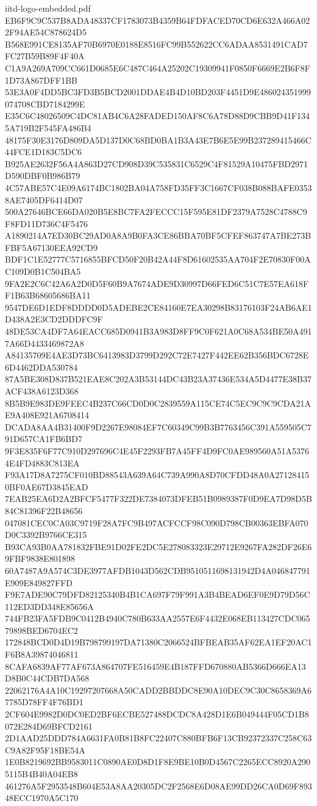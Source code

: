 \begin{filecontents*}[overwrite]{iitd-logo-embedded.pdf}
EB6F9C9C537B8ADA48337CF1783073B4359B64FDFACED70CD6E632A466A022F94AE54C878624D5
B568E991CE8135AF70B6970E0188E8516FC99B552622CC6ADAA8531491CAD7FC27B59B89F4F40A
C1A9A269A709CC661D0685E6C487C464A25202C19309941F0850F6669E2B6F8F1D73A867DFF1BB
53E3A0F4DD5BC3FD3B5BCD2001DDAE4B4D10BD203F4451D9E486024351999074708CBD7184299E
E35C6C48026509C4DC81AB4C6A28FADED150AF8C6A78D88D9CBB9D41F1345A719B2F545FA486B4
48175F30E3176D809DA5D137D0C68BD0BA1B3A43E7B6E5E99B237289415466C44FCE1D183C5DC6
B925AE2632F56A4A863D27CD908D39C535831C6529C4F81529A10475FBD2971D590DBF0B986B79
4C57ABE57C4E09A6174BC1802BA04A758FD35FF3C1667CF038B088BAFE03538AE7405DF6414D07
500A27646BCE66DA020B5E8BC7FA2FECCC15F595E81DF2379A7528C4788C9F8FD11D736C4F5476
A1890214A7ED30BC29AD0A8A9B0FA3CE86BBA70BF5CFEF863747A7BE273BFBF5A67130EEA92CD9
BDF1C1E52777C5716855BFCD50F20B42A44F8D61602535AA704F2E70830F00AC109D0B1C504BA5
9FA2E2C6C42A6A2D0D5F60B9A7674ADE9D30997D66FED6C51C7E57EA618FF1B63B68605686BA11
9547DE6D1EDF8DDDD0D5ADEBE2CE84160E7EA30298B83176103F24AB6AE1D438A2E3CD2DDDFC9F
48DE53CA4DF7A64EACC685D0941B3A983D8FF9C0F621A0C68A534BE50A4917A66D4433469872A8
A84135709E4AE3D73BC6413983D3799D292C72E7427F442EE62B356BDC6728E6D4462DDA530784
87A5BE308D837B521EAE8C202A3B53144DC43B23A37436E534A5D4477E38B37ACF438A6123D368
8B5B9E983DE9FEEC4B237C66CD0D0C2839559A115CE74C5EC9C9C9CDA21AE9A408E921A6708414
DCADA8AA4B31400F9D2267E98084EF7C60349C99B3B7763456C391A559505C791D657CA1FB6BD7
9F3E835F6F77C910D297696C4E45F2293FB7A45FF4D9FC0AE989560A51A53764E4FD4883C813EA
F93A17D8A7275CF010BD88543A639A64C739A990A8D70CFDD48A0A271284150BF0AE67D3845EAD
7EAB25EA6D2A2BFCF5477F322DE7384073DFEB51B0989387F0D9EA7D98D5B84C81396F22B48656
047081CEC0CA03C9719F28A7FC9B497ACFCCF98C090D798CB00363EBFA070D0C3392B9766CE315
B93CA93B0AA781832FBE91D02FE2DC5E278083323E29712E9267FA282DF26E69FBF9838E801898
60A7487A9A574C3DE3977AFDB1043D562CDB9510511698131942D4A046847791E909E849827FFD
F9E7ADE90C79DFD82125340B4B1CA697F79F991A3B4BEAD6EF0E9D79D56C112ED3DD348E85656A
744FB23FA5FDB9C0412B4940C780B633AA2557E6F4432E068EB113427CDC06579898BED6704EC2
172848BCD0D4D19B798799197DA71380C2066524BFBEAB35AF62EA1EF20AC1F6B8A39874046811
8CAFA6839AF77AF673A864707FE516459E4B187FFD670880AB5366D666EA13D8B0C44CDB7DA568
22062176A4A10C19297207668A50CADD2BBDDC8E90A10DEC9C30C8658369A67785D78FF4F76BD1
2CF604E9982D0DC0ED2BF6ECBE527488DCDC8A428D1E6B049444F05CD1B8072E284D69BFCD2161
2D1AAD25DDD784A6631FA0B81B8FC22407C880BFB6F13CB92372337C258C63C9A82F95F18BE54A
1E0B8219692BB9583011C0890AE0D8D1F8E9BE10B0D4567C2265ECC8920A2905115B4B40A04EB8
461276A5F2953548B604E53A8AA20305DC2F2568E6D08AE99DD26CA0D69F89348ECC1970A5C170

\end{filecontents*}
